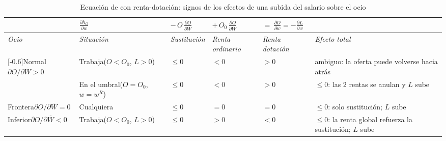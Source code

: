 \documentclass[11pt]{article}
\begin{document}
\begin{table}[H]
\centering\small
\caption{Ecuación de  con renta-dotación: signos de los efectos de una subida del salario sobre el ocio}\label{tab:slutsky-dotacion}
\renewcommand{\arraystretch}{1.3}
\begin{tabular}{|>{\centering\arraybackslash}m{2.0cm}|>{\centering\arraybackslash}m{2.3cm}|>{\centering\arraybackslash}m{2.0cm}|>{\centering\arraybackslash}m{2.2cm}|>{\centering\arraybackslash}m{2.2cm}|>{\centering\arraybackslash}m{3.1cm}|}
\hline
\multicolumn{2}{|c|}{\cellcolor{tceesalvia}Ecuación} & \cellcolor{tceesalvia}$\displaystyle\frac{\partial h_O}{\partial w}$ & \cellcolor{tceesalvia}$\displaystyle-\,O\,\frac{\partial O}{\partial\overline{W}}$ & \cellcolor{tceesalvia}$\displaystyle+\,O_0\,\frac{\partial O}{\partial\overline{W}}$ & \cellcolor{tceesalvia}$\displaystyle=\ \frac{\partial O}{\partial w}=-\frac{\partial L}{\partial w}$\\
\hline
\rowcolor{tceeazulpalido}\textit{Ocio} & \textit{Situación} & \textit{Sustitución} & \textit{Renta ordinario} & \textit{Renta dotación} & \textit{Efecto total}\\
\hline
\multirow{2}{=}[-0.6\baselineskip]{\centering\textcolor{tceeverde}{Normal\newline $\partial O/\partial\overline{W}>0$}} & Trabaja\newline ($O<O_0$, $L>0$) & $\leq 0$ & \textcolor{tceeverde}{$<0$} & \textcolor{tceeverde}{$>0$} & \textcolor{tceerojo}{ambiguo: la oferta puede volverse hacia atrás}\\
\hhline{|~|-|-|-|-|-|}
 & En el umbral\newline ($O=O_0$, $w=w^R$) & $\leq 0$ & \textcolor{tceeverde}{$<0$} & \textcolor{tceeverde}{$>0$} & \textcolor{tceeazul}{$\leq 0$: las 2 rentas se anulan y $L$ sube}\\
\hline
Frontera\newline $\partial O/\partial\overline{W}=0$ & Cualquiera & $\leq 0$ & $=0$ & $=0$ & \textcolor{tceeazul}{$\leq 0$: solo sustitución; $L$ sube}\\
\hline
\textcolor{tceedorado}{Inferior\newline $\partial O/\partial\overline{W}<0$} & Trabaja\newline ($O<O_0$, $L>0$) & $\leq 0$ & \textcolor{tceedorado}{$>0$} & \textcolor{tceedorado}{$<0$} & \textcolor{tceeazul}{$\leq 0$: la renta global refuerza la sustitución; $L$ sube}\\
\hline
\end{tabular}
\par\vspace{2pt}{\footnotesize Con una dotación de tiempo, $O\leq O_0$ siempre: no hay «demandante neto» de ocio, a diferencia de un bien del que se puede comprar más de lo que se tiene. El caso habitual es el de la primera fila.}
\end{table}
\end{document}
